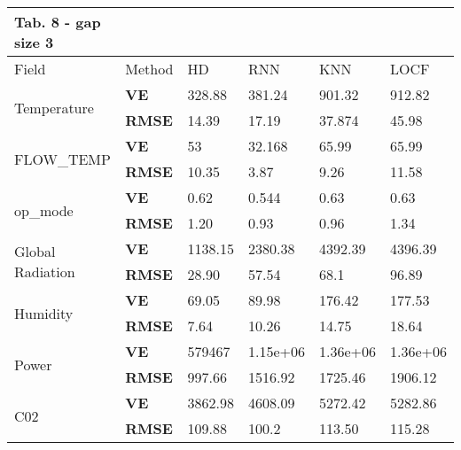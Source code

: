 \documentclass[9.5pt,article,twocolumn]{article}
\begin{document}
{{\begin{tabular}{llllll}
\textbf{Tab. 8 -} gap size 3
\\
\hline
\multicolumn{1}{l}{Field}   & Method & HD & RNN & KNN & LOCF \\
\hline
\multirow{2}{*}{Temperature}      & \textbf{VE}   & 328.88  & 381.24      & 901.32      & 912.82      \\
                                  & \textbf{RMSE} & 14.39   & 17.19       & 37.874      & 45.98       \\
\multirow{2}{*}{FLOW\_TEMP}       & \textbf{VE}   & 53      & 32.168      & 65.99       & 65.99       \\
                                  & \textbf{RMSE} & 10.35   & 3.87        & 9.26        & 11.58       \\
\multirow{2}{*}{op\_mode}         & \textbf{VE}   & 0.62    & 0.544       & 0.63        & 0.63        \\
                                  & \textbf{RMSE} & 1.20    & 0.93        & 0.96        & 1.34        \\
\multirow{2}{*}{Global Radiation} & \textbf{VE}   & 1138.15 & 2380.38     & 4392.39     & 4396.39     \\
                                  & \textbf{RMSE} & 28.90   & 57.54       & 68.1        & 96.89       \\
\multirow{2}{*}{Humidity}         & \textbf{VE}   & 69.05   & 89.98       & 176.42      & 177.53      \\
                                  & \textbf{RMSE} & 7.64    & 10.26       & 14.75       & 18.64       \\
\multirow{2}{*}{Power}            & \textbf{VE}   & 579467  & 1.15e+06 & 1.36e+06       & 1.36e+06 \\
                                  & \textbf{RMSE} & 997.66  & 1516.92     & 1725.46     & 1906.12     \\
\multirow{2}{*}{C02}              & \textbf{VE}   & 3862.98 & 4608.09     & 5272.42     & 5282.86     \\
                                  & \textbf{RMSE} & 109.88  & 100.2       & 113.50      & 115.28      \\
\hline                            
\end{tabular}
}

}
\end{document}
